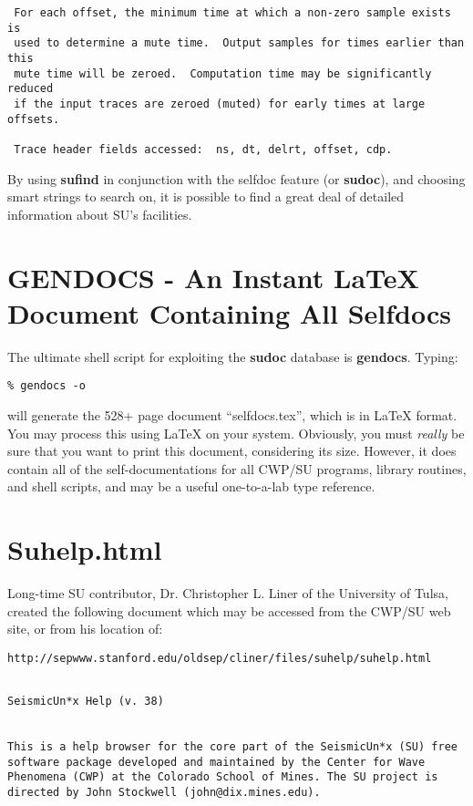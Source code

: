 {{{\begin{verbatim}
 For each offset, the minimum time at which a non-zero sample exists is 
 used to determine a mute time.  Output samples for times earlier than this
 mute time will be zeroed.  Computation time may be significantly reduced
 if the input traces are zeroed (muted) for early times at large offsets.
                                                                        
 Trace header fields accessed:  ns, dt, delrt, offset, cdp.             
\end{verbatim}}\noindent
By using {\bf sufind\/} in conjunction with the selfdoc feature (or {\bf sudoc}),
and choosing smart strings to search on, it is possible to find
a great deal of detailed information about SU's facilities.

\section{GENDOCS - An Instant LaTeX Document Containing All Selfdocs}
The ultimate shell script for exploiting the {\bf sudoc\/} database is
{\bf gendocs}. Typing:
{\small \begin{verbatim}
% gendocs -o
\end{verbatim}}\noindent
will generate the 528+ page document ``selfdocs.tex'', which is
in LaTeX format. You may process this using LaTeX on your system.
Obviously, you must {\em really\/} be sure that you want to print this
document, considering its size.
However, it does contain all of the self-documentations for all
CWP/SU programs, library routines, and shell scripts, and may be
a useful one-to-a-lab type reference.

\section{Suhelp.html}
Long-time SU contributor, Dr. Christopher L. Liner of the University
of Tulsa, created the following  document which may be accessed
from the CWP/SU web site, or from his location of:

\begin{verbatim}
http://sepwww.stanford.edu/oldsep/cliner/files/suhelp/suhelp.html
\end{verbatim}

{\small\begin{verbatim}

SeismicUn*x Help (v. 38)
     

This is a help browser for the core part of the SeismicUn*x (SU) free software package developed and maintained by the Center for Wave Phenomena (CWP) at the Colorado School of Mines. The SU project is directed by John Stockwell (john@dix.mines.edu).


\end{verbatim}}}}
